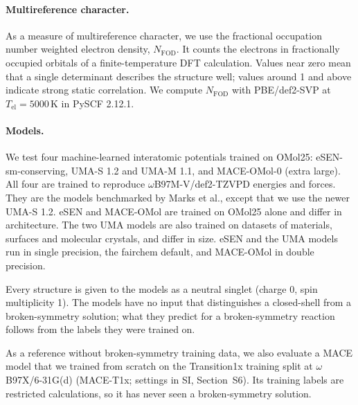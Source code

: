 \paragraph{Multireference character.}
As a measure of multireference character, we use the fractional occupation number weighted electron density, $N_\mathrm{FOD}$\cite{grimme2015fod}. It counts the electrons in fractionally occupied orbitals of a finite-temperature DFT calculation. Values near zero mean that a single determinant describes the structure well; values around 1 and above indicate strong static correlation. We compute $N_\mathrm{FOD}$ with PBE/def2-SVP at $T_\mathrm{el} = 5000$\,K in PySCF 2.12.1\cite{pyscf}.

\paragraph{Models.}
We test four machine-learned interatomic potentials trained on OMol25: eSEN-sm-conserving\cite{fu2025esen}, UMA-S 1.2 and UMA-M 1.1\cite{wood2025uma}, and MACE-OMol-0 (extra large)\cite{batatia2025maceomol}. All four are trained to reproduce $\omega$B97M-V/def2-TZVPD energies and forces. They are the models benchmarked by Marks et al.\cite{marks2026fsm}, except that we use the newer UMA-S 1.2. eSEN and MACE-OMol are trained on OMol25 alone and differ in architecture. The two UMA models are also trained on datasets of materials, surfaces and molecular crystals, and differ in size. eSEN and the UMA models run in single precision, the fairchem default, and MACE-OMol in double precision.

Every structure is given to the models as a neutral singlet (charge 0, spin multiplicity 1). The models have no input that distinguishes a closed-shell from a broken-symmetry solution; what they predict for a broken-symmetry reaction follows from the labels they were trained on.

As a reference without broken-symmetry training data, we also evaluate a MACE model\cite{batatia2022mace} that we trained from scratch on the Transition1x training split at $\omega$B97X/6-31G(d) (MACE-T1x; settings in SI, Section~S6). Its training labels are restricted calculations, so it has never seen a broken-symmetry solution.

